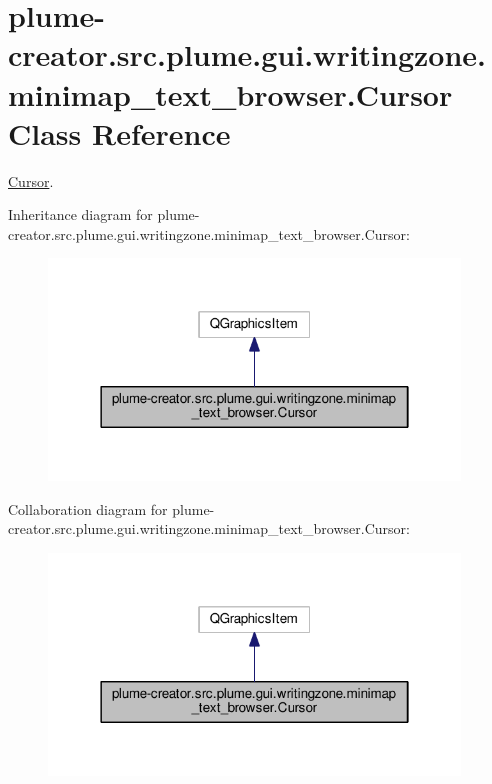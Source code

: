 \hypertarget{classplume-creator_1_1src_1_1plume_1_1gui_1_1writingzone_1_1minimap__text__browser_1_1_cursor}{}\section{plume-\/creator.src.\+plume.\+gui.\+writingzone.\+minimap\+\_\+text\+\_\+browser.\+Cursor Class Reference}
\label{classplume-creator_1_1src_1_1plume_1_1gui_1_1writingzone_1_1minimap__text__browser_1_1_cursor}


\hyperlink{classplume-creator_1_1src_1_1plume_1_1gui_1_1writingzone_1_1minimap__text__browser_1_1_cursor}{Cursor}.  




Inheritance diagram for plume-\/creator.src.\+plume.\+gui.\+writingzone.\+minimap\+\_\+text\+\_\+browser.\+Cursor\+:\nopagebreak
\begin{figure}[H]
\begin{center}
\leavevmode
\includegraphics[width=310pt]{classplume-creator_1_1src_1_1plume_1_1gui_1_1writingzone_1_1minimap__text__browser_1_1_cursor__inherit__graph}
\end{center}
\end{figure}


Collaboration diagram for plume-\/creator.src.\+plume.\+gui.\+writingzone.\+minimap\+\_\+text\+\_\+browser.\+Cursor\+:\nopagebreak
\begin{figure}[H]
\begin{center}
\leavevmode
\includegraphics[width=310pt]{classplume-creator_1_1src_1_1plume_1_1gui_1_1writingzone_1_1minimap__text__browser_1_1_cursor__coll__graph}
\end{center}
\end{figure}
